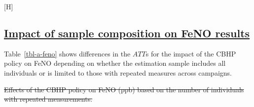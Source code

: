 \documentclass[
  letterpaper,
  DIV=11,
  numbers=noendperiod]{scrartcl}
\makeatletter
\renewenvironment{table}%
   {\renewcommand\familydefault\sfdefault
    \@float{table}}
   {\end@float}
\renewenvironment{figure}%
   {\renewcommand\familydefault\sfdefault
    \@float{figure}}
   {\end@float}
\providecommand{\DIFadd}[1]{{\protect\color{blue}\underline{#1}}} %
\providecommand{\DIFdel}[1]{{\protect\color{red}\sout{#1}}}                      %
\providecommand{\DIFaddbegin}{} %
\providecommand{\DIFaddend}{} %
\providecommand{\DIFdelbegin}{} %
\providecommand{\DIFdelend}{} %
\providecommand{\DIFdelFL}[1]{\DIFdel{#1}} %
\providecommand{\DIFaddbeginFL}{} %
\providecommand{\DIFaddendFL}{} %
\providecommand{\DIFdelbeginFL}{} %
\providecommand{\DIFdelendFL}{} %
\newcommand{\DIFscaledelfig}{0.5}
\newlength{\DIFdelgraphicswidth} %
\newlength{\DIFdelgraphicsheight} %
\newcommand{\DIFaddincludegraphics}[2][]{{\color{blue}\fbox{\DIFOincludegraphics[#1]{#2}}}} %
\newcommand{\DIFdelincludegraphics}[2][]{%
\sbox{\DIFdelgraphicsbox}{\DIFOincludegraphics[#1]{#2}}%
\settoboxwidth{\DIFdelgraphicswidth}{\DIFdelgraphicsbox} %
\settoboxtotalheight{\DIFdelgraphicsheight}{\DIFdelgraphicsbox} %
\scalebox{\DIFscaledelfig}{%
\parbox[b]{\DIFdelgraphicswidth}{\usebox{\DIFdelgraphicsbox}\\[-\baselineskip] \rule{\DIFdelgraphicswidth}{0em}}\llap{\resizebox{\DIFdelgraphicswidth}{\DIFdelgraphicsheight}{%
\setlength{\unitlength}{\DIFdelgraphicswidth}%
\begin{picture}(1,1)%
\thicklines\linethickness{2pt} %
{\color[rgb]{1,0,0}\put(0,0){\framebox(1,1){}}}%
{\color[rgb]{1,0,0}\put(0,0){\line( 1,1){1}}}%
{\color[rgb]{1,0,0}\put(0,1){\line(1,-1){1}}}%
\end{picture}%
}\hspace*{3pt}}} %
} %
\DeclareRobustCommand{\DIFaddbegin}{\DIFOaddbegin \let\includegraphics\DIFaddincludegraphics} %
\DeclareRobustCommand{\DIFaddend}{\DIFOaddend \let\includegraphics\DIFOincludegraphics} %
\DeclareRobustCommand{\DIFdelbegin}{\DIFOdelbegin \let\includegraphics\DIFdelincludegraphics} %
\DeclareRobustCommand{\DIFdelend}{\DIFOaddend \let\includegraphics\DIFOincludegraphics} %
\DeclareRobustCommand{\DIFaddbeginFL}{\DIFOaddbeginFL \let\includegraphics\DIFaddincludegraphics} %
\DeclareRobustCommand{\DIFaddendFL}{\DIFOaddendFL \let\includegraphics\DIFOincludegraphics} %
\DeclareRobustCommand{\DIFdelbeginFL}{\DIFOdelbeginFL \let\includegraphics\DIFdelincludegraphics} %
\DeclareRobustCommand{\DIFdelendFL}{\DIFOaddendFL \let\includegraphics\DIFOincludegraphics} %
\makeatother
\begin{document}
\begin{figure}[H]

\DIFdelbeginFL %
\DIFdelendFL \DIFaddbeginFL {}
\DIFaddendFL 

\DIFdelbeginFL %

\DIFdelendFL \caption{\label{fig-afig-mixed-ct}Adjusted and unadjusted treatment
effect for outdoor and personal exposure (µg/m\textsuperscript{3}) to
the mixed combustion source by treatment year.}

\end{figure}%

\newpage

\DIFdelbegin %
\DIFdelend \DIFaddbegin \subsection{\DIFadd{Impact of sample composition on FeNO
results}}\label{impact-of-sample-composition-on-feno-results}
\DIFaddend 

Table~\ref{tbl-a-feno} shows differences in the \(ATT\)s for the impact
of the CBHP policy on FeNO depending on whether the estimation sample
includes all individuals or is limited to those with repeated measures
across campaigns.

\DIFdelbegin %
{%
\DIFdelFL{Effects of the CBHP policy on FeNO (ppb) based on the number of
individuals with repeated measurements. }}%
\end{document}
